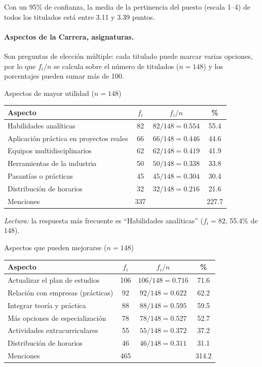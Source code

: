 Con un 95\% de confianza, la media de la pertinencia del puesto (escala 1--4) de todos los titulados está entre 3.11 y 3.39 puntos.

\paragraph{Aspectos de la Carrera, asignaturas.} Son preguntas de elección múltiple: cada titulado puede marcar varias opciones, por lo que $f_i/n$ se calcula sobre el número de titulados ($n = 148$) y los porcentajes pueden sumar más de 100.

\begin{mitabla}{Aspectos de mayor utilidad ($n=148$)}
\begin{tabular}{lccc}
\toprule
Aspecto & $f_i$ & $f_i / n$ & \% \\
\midrule
Habilidades analíticas & 82 & $82/148 = 0.554$ & 55.4 \\
Aplicación práctica en proyectos reales & 66 & $66/148 = 0.446$ & 44.6 \\
Equipos multidisciplinarios & 62 & $62/148 = 0.419$ & 41.9 \\
Herramientas de la industria & 50 & $50/148 = 0.338$ & 33.8 \\
Pasantías o prácticas & 45 & $45/148 = 0.304$ & 30.4 \\
Distribución de horarios & 32 & $32/148 = 0.216$ & 21.6 \\
\midrule
Menciones & 337 & & 227.7 \\
\bottomrule
\end{tabular}
\end{mitabla}

\textit{Lectura:} la respuesta más frecuente es ``Habilidades analíticas'' ($f_i = 82$, 55.4\% de 148).

\begin{mitabla}{Aspectos que pueden mejorarse ($n=148$)}
\begin{tabular}{lccc}
\toprule
Aspecto & $f_i$ & $f_i / n$ & \% \\
\midrule
Actualizar el plan de estudios & 106 & $106/148 = 0.716$ & 71.6 \\
Relación con empresas (prácticas) & 92 & $92/148 = 0.622$ & 62.2 \\
Integrar teoría y práctica & 88 & $88/148 = 0.595$ & 59.5 \\
Más opciones de especialización & 78 & $78/148 = 0.527$ & 52.7 \\
Actividades extracurriculares & 55 & $55/148 = 0.372$ & 37.2 \\
Distribución de horarios & 46 & $46/148 = 0.311$ & 31.1 \\
\midrule
Menciones & 465 & & 314.2 \\
\bottomrule
\end{tabular}
\end{mitabla}

